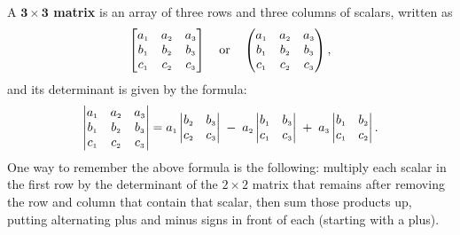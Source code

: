 A \textbf{$\bm{3 \times 3}$ matrix} is an array of three rows and three columns of scalars, written as
\begin{displaymath}
 \begin{bmatrix}
  a_{\scriptscriptstyle 1} & a_{\scriptscriptstyle 2} &a_{\scriptscriptstyle 3}\\
  b_{\scriptscriptstyle 1} & b_{\scriptscriptstyle 2} &b_{\scriptscriptstyle 3}\\
  c_{\scriptscriptstyle 1} & c_{\scriptscriptstyle 2} &c_{\scriptscriptstyle 3}
 \end{bmatrix}
 \quad\text{or}\quad
 \begin{pmatrix}
  a_{\scriptscriptstyle 1} & a_{\scriptscriptstyle 2} &a_{\scriptscriptstyle 3}\\
  b_{\scriptscriptstyle 1} & b_{\scriptscriptstyle 2} &b_{\scriptscriptstyle 3}\\
  c_{\scriptscriptstyle 1} & c_{\scriptscriptstyle 2} &c_{\scriptscriptstyle 3}
 \end{pmatrix},
\end{displaymath}
and its determinant is given by the formula:
\begin{equation}
 \begin{vmatrix}
  a_{\scriptscriptstyle 1} & a_{\scriptscriptstyle 2} &a_{\scriptscriptstyle 3}\\
  b_{\scriptscriptstyle 1} & b_{\scriptscriptstyle 2} &b_{\scriptscriptstyle 3}\\
  c_{\scriptscriptstyle 1} & c_{\scriptscriptstyle 2} &c_{\scriptscriptstyle 3}
 \end{vmatrix}
 = a_{\scriptscriptstyle 1} \begin{vmatrix} b_{\scriptscriptstyle 2} & b_{\scriptscriptstyle 3} \\ c_{\scriptscriptstyle 2} & c_{\scriptscriptstyle 3} \end{vmatrix} \;-\;
 a_{\scriptscriptstyle 2} \begin{vmatrix} b_{\scriptscriptstyle 1} & b_{\scriptscriptstyle 3} \\ c_{\scriptscriptstyle 1} & c_{\scriptscriptstyle 3} \end{vmatrix} \;+\;
 a_{\scriptscriptstyle 3} \begin{vmatrix} b_{\scriptscriptstyle 1} & b_{\scriptscriptstyle 2} \\ c_{\scriptscriptstyle 1} & c_{\scriptscriptstyle 2} \end{vmatrix}.
 \label{eqn:det3}
\end{equation}
One way to remember the above formula is the following: multiply each scalar in the first row by the determinant
of the $2 \times 2$ matrix that remains after removing the row and column that contain that scalar, then sum those
products up, putting alternating plus and minus signs in front of each (starting with a plus).

